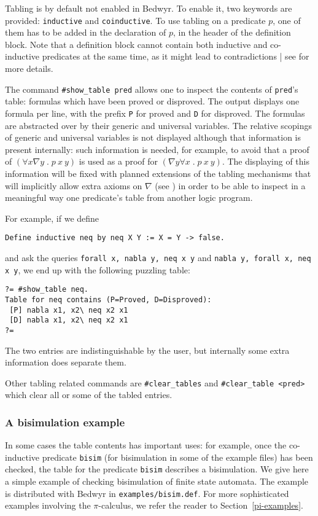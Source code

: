 \documentclass{article}
\newcommand{\qs}{\; . \;}
\begin{document}
Tabling is by default not enabled in Bedwyr. To enable it, two keywords
are provided: \texttt{inductive} and \texttt{coinductive}.
To use tabling on a predicate $p$, one of them has to be added in the
declaration of $p$, in the header of the definition block.
Note that a definition block cannot contain both inductive and
co-inductive predicates at the same time, as it might lead to
contradictions | see \cite{momigliano03types} for more details.

The command \verb/#show_table pred/ allows one to inspect the contents of
\verb.pred.'s table: formulas which have been proved or disproved. The
output displays one formula per line, with the prefix \verb.P. for
proved and \verb.D. for disproved. The formulas are abstracted over by
their generic and universal variables. The relative scopings of generic
and universal variables is not displayed although that information is
present internally: such information is needed, for example, to avoid
that a proof of $(\forall x\nabla y\qs p~x~y)$ is used as a proof for
$(\nabla y\forall x\qs p~x~y)$.  The displaying of this information will
be fixed with planned extensions of the tabling mechanisms that will
implicitly allow extra axioms on $\nabla$ (see \cite{tiu06lfmtp}) in
order to be able to inspect in a meaningful way one predicate's table
from another logic program.

For example, if we define
\begin{verbatim}Define inductive neq by neq X Y := X = Y -> false.\end{verbatim}
and ask the queries \texttt{forall x, nabla y, neq x y}
and \texttt{nabla y, forall x, neq x y}, we end up with the following
puzzling table:
\begin{verbatim}
?= #show_table neq.
Table for neq contains (P=Proved, D=Disproved):
 [P] nabla x1, x2\ neq x2 x1
 [D] nabla x1, x2\ neq x2 x1
?=
\end{verbatim}
The two entries are indistinguishable by the user, but internally some
extra information does separate them.

Other tabling related commands are \verb/#clear_tables/ and
\verb/#clear_table <pred>/ which clear all or some of the tabled entries.

\subsubsection{A bisimulation example}

In some cases the table contents has important uses: for
example, once the co-inductive predicate {\tt bisim} (for bisimulation
in some of the example files) has been checked, the table for the
predicate {\tt bisim} describes a bisimulation.
We give here a simple example of checking bisimulation of finite
state automata.
The example is distributed with Bedwyr in \verb+examples/bisim.def+.
For more sophisticated examples involving the $\pi$-calculus,
we refer the reader to Section~\ref{pi-examples}.
\end{document}
